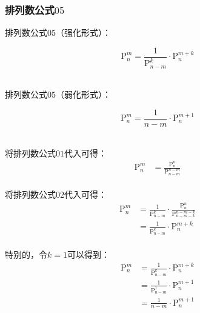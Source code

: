 \documentclass[UTF8]{ctexart}
\begin{document}
\subsubsection{排列数公式$05$}
    排列数公式$05$（强化形式）：
    \begin{large}
        \begin{equation*}
            \mathrm{P}_n^m=\frac{1}{\mathrm{P}_{n-m}^k}\cdot\mathrm{P}_{n}^{m+k}
        \end{equation*}
    \end{large}\\
    排列数公式$05$（弱化形式）：
    \begin{large}
        \begin{equation*}
            \mathrm{P}_n^m=\frac{1}{n-m}\cdot\mathrm{P}_{n}^{m+1}
        \end{equation*}
    \end{large}\\
    将排列数公式$01$代入可得：
    \setcounter{equation}{0}
    \begin{align}
        \mathrm{P}_n^m&=\frac{\mathrm{P}_n^n}{\mathrm{P}_{n-m}^{n-m}}
    \end{align}\\
    将排列数公式$02$代入可得：
    \begin{align}
        \mathrm{P}_n^m
        &=\frac{1}{\mathrm{P}_{n-m}^k}\cdot\frac{\mathrm{P}_{n}^{n}}{\mathrm{P}_{n-m-k}^{n-m-k}}\\[3mm]
        &=\frac{1}{\mathrm{P}_{n-m}^k}\cdot\mathrm{P}_{n}^{m+k}
    \end{align}\\
    特别的，令$k=1$可以得到：
    \begin{align}
        \mathrm{P}_n^m
        &=\frac{1}{\mathrm{P}_{n-m}^k}\cdot\mathrm{P}_{n}^{m+k}\\[3mm]
        &=\frac{1}{\mathrm{P}_{n-m}^1}\cdot\mathrm{P}_{n}^{m+1}\\[3mm]
        &=\frac{1}{n-m}\cdot\mathrm{P}_{n}^{m+1}
    \end{align}

\newpage
\end{document}
